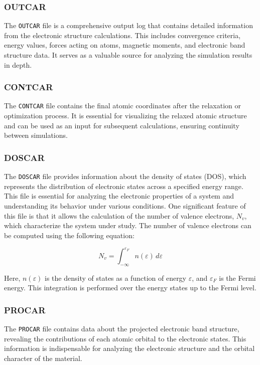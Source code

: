 \subsubsection{OUTCAR}
The \texttt{OUTCAR} file is a comprehensive output log that contains detailed information from the electronic structure calculations. This includes convergence criteria, energy values, forces acting on atoms, magnetic moments, and electronic band structure data. It serves as a valuable source for analyzing the simulation results in depth.

\subsubsection{CONTCAR}
The \texttt{CONTCAR} file contains the final atomic coordinates after the relaxation or optimization process. It is essential for visualizing the relaxed atomic structure and can be used as an input for subsequent calculations, ensuring continuity between simulations.

\subsubsection{DOSCAR}
The \texttt{DOSCAR} file provides information about the density of states (DOS), which represents the distribution of electronic states across a specified energy range. This file is essential for analyzing the electronic properties of a system and understanding its behavior under various conditions. One significant feature of this file is that it allows the calculation of the number of valence electrons, \( N_v \), which characterize the system under study. The number of valence electrons can be computed using the following equation:

\begin{equation}
	N_v = \int_{-\infty}^{\varepsilon_{F}} n(\varepsilon) \, d\varepsilon 
\end{equation}

Here, \( n(\varepsilon) \) is the density of states as a function of energy \( \varepsilon \), and \( \varepsilon_{F} \) is the Fermi energy. This integration is performed over the energy states up to the Fermi level.

\subsubsection{PROCAR}
The \texttt{PROCAR} file contains data about the projected electronic band structure, revealing the contributions of each atomic orbital to the electronic states. This information is indispensable for analyzing the electronic structure and the orbital character of the material.

